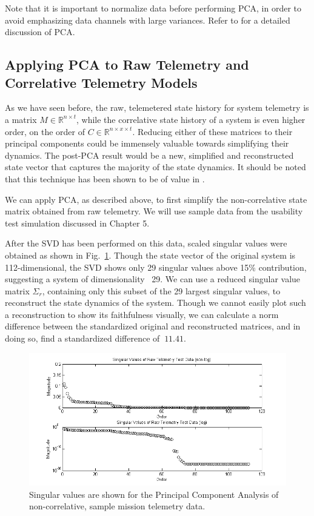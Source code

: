 Note that it is important to normalize data before performing PCA, in order to avoid emphasizing data channels with large variances. Refer to \cite{shlens2014tutorial} for a detailed discussion of PCA.

\subsection{Applying PCA to Raw Telemetry and Correlative Telemetry Models}

As we have seen before, the raw, telemetered state history for system telemetry is a matrix $M \in \mathbb{R}^{n \times t}$, while the correlative state history of a system is even higher order, on the order of $C \in \mathbb{R}^{n \times x \times t}$. Reducing either of these matrices to their principal components could be immensely valuable towards simplifying their dynamics. The post-PCA result would be a new, simplified and reconstructed state vector that captures the majority of the state dynamics. It should be noted that this technique has been shown to be of value in \cite{villegas2010principal}.

We can apply PCA, as described above, to first simplify the non-correlative state matrix obtained from raw telemetry. We will use sample data from the usability test simulation discussed in Chapter 5.

After the SVD has been performed on this data, scaled singular values were obtained as shown in Fig.~\ref{fig:raw_telem_svs}. Though the state vector of the original system is 112-dimensional, the SVD shows only 29 singular values above 15\% contribution, suggesting a system of dimensionality ~29. We can use a reduced singular value matrix $\Sigma_{r}$, containing only this subset of the 29 largest singular values, to reconstruct the state dynamics of the system. Though we cannot easily plot such a reconstruction to show its faithfulness visually, we can calculate a norm difference between the standardized original and reconstructed matrices, and in doing so, find a standardized difference of $~11.41$.

\begin{figure}[h]
\centering
    \includegraphics[width=\columnwidth]{images/raw_telem_svs.png}
    \caption{Singular values are shown for the Principal Component Analysis of non-correlative, sample mission telemetry data.}
    \label{fig:raw_telem_svs}
\end{figure}

